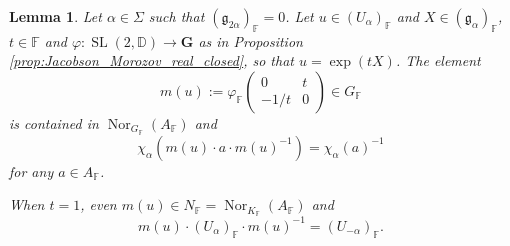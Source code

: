 \documentclass[12pt]{amsart}
\newcommand{\F}{\mathbb{F} }
\newcommand{\D}{\mathbb{D} }
\newcommand{\frakg}{\mathfrak{g}}
\newcommand{\bG}{\mathbf{G}}
\numberwithin{equation}{section}
\newtheorem{lemma}[theorem]{Lemma}
\theoremstyle{remark} %
\begin{document}
\begin{lemma}\label{lem:Jacobson_Morozov_m}
	Let $\alpha \in \Sigma$ such that $(\mathfrak{g}_{2\alpha})_\F = 0$. Let $u \in (U_\alpha)_\F $ and $X\in (\frakg_\alpha)_\F$, $t\in \F$ and $\varphi \colon \operatorname{SL}(2,\D) \to \bG$ as in Proposition \ref{prop:Jacobson_Morozov_real_closed}, so that $u = \exp(tX)$. The element
	$$
	m(u) := \varphi_\F \begin{pmatrix}
		0 & t \\ -1/t & 0
	\end{pmatrix} \in G_\F
	$$ 
	is contained in $\operatorname{Nor}_{G_\F}(A_\F)$ and 
	$$
	\chi_\alpha(m(u)\cdot a\cdot m(u)^{-1}) = \chi_\alpha(a)^{-1}
	$$ 
	for any $a \in A_\F$.
	
	When $t=1$, even $m(u) \in N_\F = \operatorname{Nor}_{K_\F}(A_\F)$ and 
	$$
	m(u) \cdot (U_\alpha)_\F \cdot  m(u)^{-1} = (U_{-\alpha})_\F.
	$$
\end{lemma}
\end{document}
